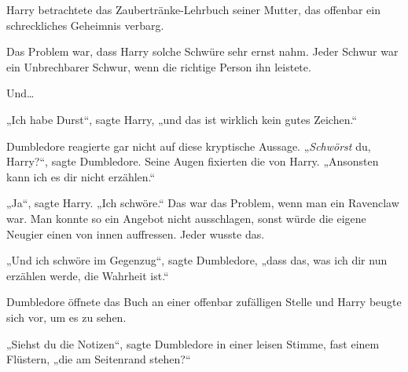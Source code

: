 Harry betrachtete das Zaubertränke-Lehrbuch seiner Mutter, das offenbar ein schreckliches Geheimnis verbarg.

Das Problem war, dass Harry solche Schwüre sehr ernst nahm. Jeder Schwur war ein Unbrechbarer Schwur, wenn die richtige Person ihn leistete.

Und…

„Ich habe Durst“, sagte Harry, „und das ist wirklich kein gutes Zeichen.“

Dumbledore reagierte gar nicht auf diese kryptische Aussage. „\emph{Schwörst} du, Harry?“, sagte Dumbledore. Seine Augen fixierten die von Harry. „Ansonsten kann ich es dir nicht erzählen.“

„Ja“, sagte Harry. „Ich schwöre.“ Das war das Problem, wenn man ein Ravenclaw war. Man konnte so ein Angebot nicht ausschlagen, sonst würde die eigene Neugier einen von innen auffressen. Jeder wusste das.

„Und ich schwöre im Gegenzug“, sagte Dumbledore, „dass das, was ich dir nun erzählen werde, die Wahrheit ist.“

Dumbledore öffnete das Buch an einer offenbar zufälligen Stelle und Harry beugte sich vor, um es zu sehen.

„Siehst du die Notizen“, sagte Dumbledore in einer leisen Stimme, fast einem Flüstern, „die am Seitenrand stehen?“

